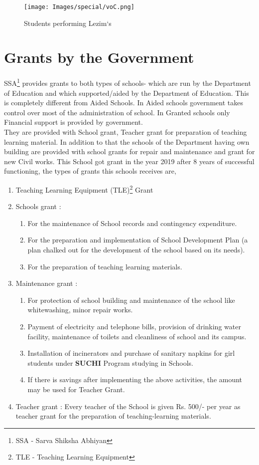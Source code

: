 \begin{figure}[H]
    \centering
    \texttt{[image: Images/special/voC.png]}
    \caption*{Students performing Lezim`s}
\end{figure}

\section{Grants by the Government}
SSA\footnote{SSA - Sarva Shiksha Abhiyan} provides grants to both types of schools- which are run by the Department of Education and which supported/aided by the Department of Education. This is completely different from Aided Schools. In Aided schools government takes control over most of the administration of school. In Granted schools only Financial support is provided by government. \\

They are provided with School grant, Teacher grant for preparation of teaching learning material. In addition to that the schools of the Department having own building are provided with school grants for repair and maintenance and grant for new Civil works. This School got grant in the year 2019 after 8 years of successful functioning, the types of grants this schools receives are,
\begin{enumerate}
    \item Teaching Learning Equipment (TLE)\footnote{TLE - Teaching Learning Equipment} Grant 
    \item Schools grant :
    \begin{enumerate}
        \item For the maintenance of School records and contingency expenditure.
        \item For the preparation and implementation of School Development Plan (a plan chalked out for the development of the school based on its needs).
        \item For the preparation of teaching learning materials.
    \end{enumerate}
    \item Maintenance grant :
    \begin{enumerate}
        \item For protection of school building and maintenance of the school like whitewashing, minor repair works.
        \item Payment of electricity and telephone bills, provision of drinking water facility,  maintenance of  toilets and cleanliness of school and its campus.
        \item Installation of incinerators and purchase of sanitary napkins for girl students under \textbf{SUCHI} Program studying in  Schools.
        \item If there is savings after implementing the above activities, the amount may be used for Teacher Grant.
    \end{enumerate}
    \item Teacher grant : Every teacher of the School is given Rs. 500/- per year as teacher grant for the preparation of teaching-learning materials.
\end{enumerate}

